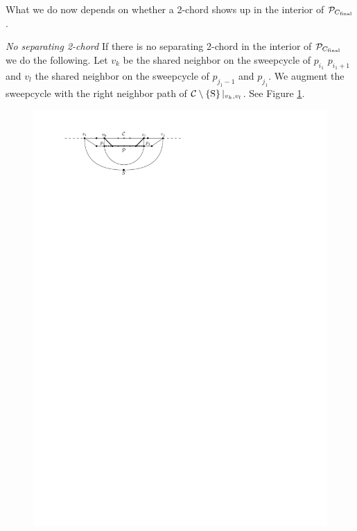     What we do now depends on whether a 2-chord shows up in the interior of $\P_{C_\text{final}}$.


    \emph{No separating 2-chord}
    If there is no separating 2-chord in the interior of $\P_{C_\text{final}}$ we do the following. Let $v_k$ be the shared neighbor on the sweepcycle of $p_{i_1}$ $p_{i_1 +1}$ and $v_l$ the shared neighbor on the sweepcycle  of $p_{j_1 -1}$ and $p_{j_1}$. We augment the sweepcycle with the right neighbor path of $\cpath|_{v_k, v_l}$. See Figure \ref{fig:sweep:chordUpdate}.

    \begin{figure}[h]
      \centering
      \includegraphics[scale=1]{unifiedAlgo/img/chordUpdate}
      \caption{}
      \label{fig:sweep:chordUpdate}
    \end{figure}

